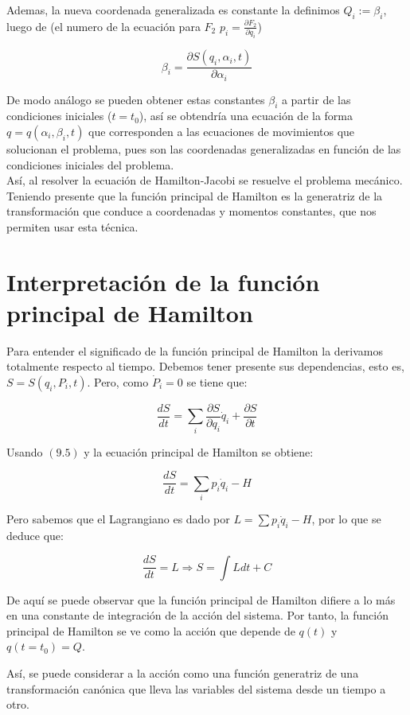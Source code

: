 \documentclass[12pt]{report}
\begin{document}
Ademas, la nueva coordenada generalizada es constante la definimos $Q_i:=\beta_i$, luego de (el numero de la ecuación para $F_2$ $p_i=\frac{\partial F_2}{\partial q_i}$)

\begin{equation}
 \beta_i=\frac{\partial S(q_i,\alpha_i,t)}{\partial \alpha_i}
\end{equation}

De modo análogo se pueden obtener estas constantes $\beta_i$ a partir de las condiciones iniciales ($t=t_0$), así se obtendría una ecuación de la forma $q=q(\alpha_i,\beta_i,t)$ que corresponden a las ecuaciones de movimientos que solucionan el problema, pues son las coordenadas generalizadas en función de las condiciones iniciales del problema. \\

Así, al resolver la ecuación de Hamilton-Jacobi se resuelve el problema mecánico. Teniendo presente que la función principal de Hamilton es la generatriz de la transformación que conduce a coordenadas y momentos constantes, que nos permiten usar esta técnica.

\section{Interpretación de la función principal de Hamilton}

Para entender el significado de la función principal de Hamilton la derivamos totalmente respecto al tiempo. Debemos tener presente sus dependencias, esto es, $S=S(q_i,P_i,t)$. Pero, como $\dot{P}_i=0$ se tiene que:

\begin{equation}
\frac{dS}{dt}= \sum_i \frac{\partial S}{\partial q_i}\dot{q}_i + \frac{\partial S}{\partial t}
\end{equation}

Usando $(9.5)$ y la ecuación principal de Hamilton se obtiene:

\begin{equation}
\frac{dS}{dt}= \sum_i p_i\dot{q}_i - H
\end{equation}

Pero sabemos que el Lagrangiano es dado por $L=\displaystyle\sum p_i\dot{q}_i - H$, por lo que se deduce que:

\begin{equation}
 \frac{dS}{dt}=L \Rightarrow S=\int Ldt + C
\end{equation}

De aquí se puede observar que la función principal de Hamilton difiere a lo más en una constante de integración de la acción del sistema. Por tanto, la función principal de Hamilton se ve como la acción que depende de $q(t)$ y $q(t=t_0)=Q$. \par
Así, se puede considerar a la acción como una función generatriz de una transformación canónica que lleva las variables del sistema desde un tiempo a otro. 
\end{document}
